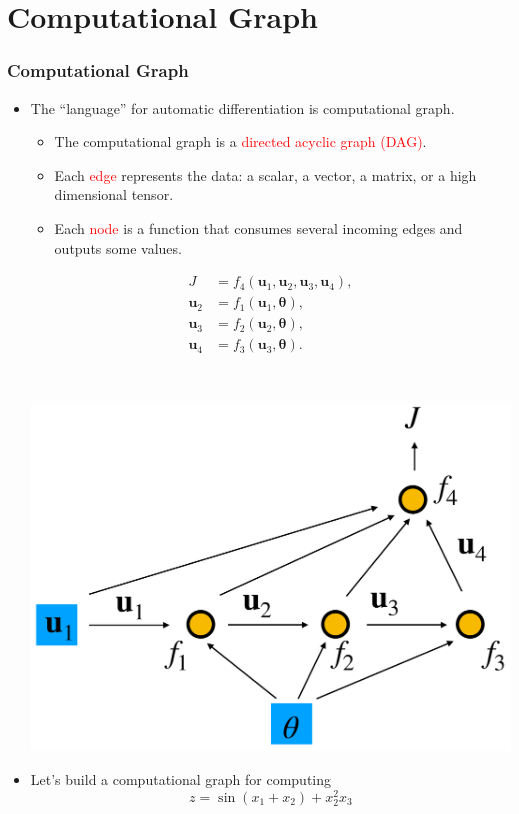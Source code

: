 \documentclass{beamer}
\newcommand{\red}[1]{\textcolor{red}{#1}}
\begin{document}
\section{Computational Graph}

\begin{frame}
	\frametitle{Computational Graph}
	
	\begin{itemize}
	\item The ``language'' for automatic differentiation is computational graph. 
	\begin{itemize}
	\item The computational graph is a \red{directed acyclic graph (DAG)}. 
	\item Each \red{edge} represents the data: a scalar, a vector, a matrix, or a high dimensional tensor. 
	\item Each \red{node} is a function that consumes several incoming edges and outputs some values. 
	\end{itemize}
	\begin{minipage}[c]{0.45\textwidth}
		\begin{align*}
  J &= f_4(\mathbf{u}_1, \mathbf{u}_2, \mathbf{u}_3, \mathbf{u}_4), \\
  \mathbf{u}_2 &= f_1(\mathbf{u}_1, \bm {\theta}), \\
       \mathbf{u}_3 &= f_2(\mathbf{u}_2, \bm {\theta}),\\
        \mathbf{u}_4 &= f_3(\mathbf{u}_3, \bm {\theta}).
\end{align*}
	\end{minipage}~
	\begin{minipage}[c]{0.45\textwidth}
		\includegraphics[width=1.0\textwidth]{figures/adjoint}
	\end{minipage}
	\item  Let's build a computational graph for computing 
 $$z=\sin(x_1+x_2) + x_2^2x_3$$
 
	\end{itemize}
\end{frame}
\end{document}
